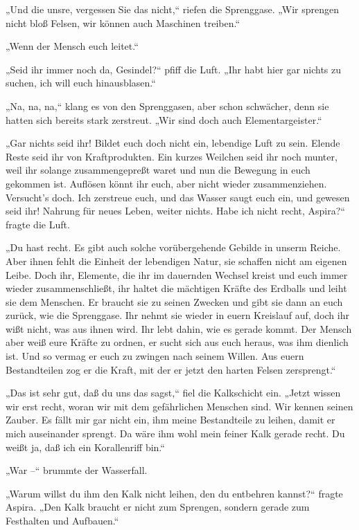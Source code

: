 „Und die unsre, vergessen Sie das nicht,“ riefen die Sprenggase.
„Wir sprengen nicht bloß Felsen, wir können auch Maschinen
treiben.“

„Wenn der Mensch euch leitet.“

„Seid ihr immer noch da, Gesindel?“ pfiff die Luft. „Ihr habt hier
gar nichts zu suchen, ich will euch hinausblasen.“

„Na, na, na,“ klang es von den Sprenggasen, aber schon schwächer,
denn sie hatten sich bereits stark zerstreut. „Wir sind doch auch
Elementargeister.“

„Gar nichts seid ihr! Bildet euch doch nicht ein, lebendige Luft zu
sein. Elende Reste seid ihr von Kraftprodukten. Ein kurzes Weilchen
seid ihr noch munter, weil ihr solange zusammengepreßt waret und
nun die Bewegung in euch gekommen ist. Auflösen könnt ihr euch,
aber nicht wieder zusammenziehen. Versucht's doch. Ich zerstreue
euch, und das Wasser saugt euch ein, und gewesen seid ihr! Nahrung
für neues Leben, weiter nichts. Habe ich nicht recht, Aspira?“
fragte die Luft.

„Du hast recht. Es gibt auch solche vorübergehende Gebilde in
unserm Reiche. Aber ihnen fehlt die Einheit der lebendigen Natur,
sie schaffen nicht am eigenen Leibe. Doch ihr, Elemente, die ihr im
dauernden Wechsel kreist und euch immer wieder zusammenschließt,
ihr haltet die mächtigen Kräfte des Erdballs und leiht sie dem
Menschen. Er braucht sie zu seinen Zwecken und gibt sie dann an
euch zurück, wie die Sprenggase. Ihr nehmt sie wieder in euern
Kreislauf auf, doch ihr wißt nicht, was aus ihnen wird. Ihr lebt
dahin, wie es gerade kommt. Der Mensch aber weiß eure Kräfte zu
ordnen, er sucht sich aus euch heraus, was ihm dienlich ist. Und so
vermag er euch zu zwingen nach seinem Willen. Aus euern
Bestandteilen zog er die Kraft, mit der er jetzt den harten Felsen
zersprengt.“

„Das ist sehr gut, daß du uns das sagst,“ fiel die Kalkschicht ein.
„Jetzt wissen wir erst recht, woran wir mit dem gefährlichen
Menschen sind. Wir kennen seinen Zauber. Es fällt mir gar nicht
ein, ihm meine Bestandteile zu leihen, damit er mich auseinander
sprengt. Da wäre ihm wohl mein feiner Kalk gerade recht. Du weißt
ja, daß ich ein Korallenriff bin.“

„War –“ brummte der Wasserfall.

„Warum willst du ihm den Kalk nicht leihen, den du entbehren
kannst?“ fragte Aspira. „Den Kalk braucht er nicht zum Sprengen,
sondern gerade zum Festhalten und Aufbauen.“

